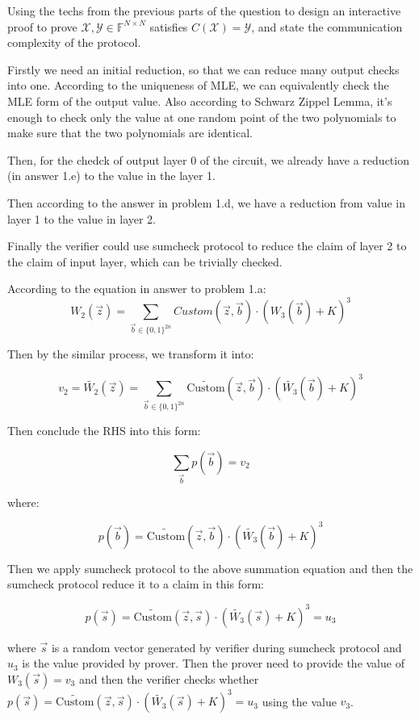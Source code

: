 \documentclass[12pt]{article}
\newenvironment{ex}[2][Exercise]{\begin{trivlist}
\item[\hskip \labelsep {\bfseries #1}\hskip \labelsep {\bfseries #2.}]\begin{spacing}{1.0}}{\end{spacing}\end{trivlist}}
\newenvironment{sol}[1][Solution]{\begin{trivlist}
\item[\hskip \labelsep {\bfseries #1:}]}{\end{trivlist}}
\begin{document}
\begin{ex}{1.f}
    Using the techs from the previous parts of the question to design an interactive proof to prove $\mathcal{X,Y} \in \mathbb{F}^{N \times N}$ satisfies $C(\mathcal{X}) = \mathcal{Y}$, and state the communication complexity of the protocol.
\end{ex}

\begin{sol}
    Firstly we need an initial reduction, so that we can reduce many output checks into one. According to the uniqueness of MLE, we can equivalently check the MLE form of the output value. Also according to Schwarz Zippel Lemma, it's enough to check only the value at one random point of the two polynomials to make sure that the two polynomials are identical.

    Then, for the chedck of output layer 0 of the circuit, we already have a reduction (in answer 1.e) to the value in the layer 1.

    Then according to the answer in problem 1.d, we have a reduction from value in layer 1 to the value in layer 2.

    Finally the verifier could use sumcheck protocol to reduce the claim of layer 2 to the claim of input layer, which can be trivially checked.

    According to the equation in answer to problem 1.a:
    $$
        W_2(\vec{z}) = \sum_{\vec{b} \in \{0,1\}^{2n}} Custom(\vec{z}, \vec{b}) \cdot (W_3(\vec{b}) + K)^3
    $$

    Then by the similar process, we transform it into:

    $$
        v_2 = \tilde{W_2}(\vec{z}) = \sum_{\vec{b} \in \{0,1\}^{2n}} \tilde{\text{Custom}}(\vec{z}, \vec{b}) \cdot (\tilde{W_3}(\vec{b}) + K)^3
    $$

    Then conclude the RHS into this form:

    $$
        \sum_{\vec{b}} p(\vec{b}) = v_2
    $$

    where:

    $$
        p(\vec{b}) = \tilde{\text{Custom}}(\vec{z}, \vec{b}) \cdot (\tilde{W_3}(\vec{b}) + K)^3
    $$

    Then we apply sumcheck protocol to the above summation equation and then the sumcheck protocol reduce it to a claim in this form:

    $$
        p(\vec{s}) = \tilde{\text{Custom}}(\vec{z}, \vec{s}) \cdot (\tilde{W_3}(\vec{s}) + K)^3 = u_3
    $$

    where $\vec{s}$ is a random vector generated by verifier during sumcheck protocol and $u_3$ is the value provided by prover. Then the prover need to provide the value of $W_3(\vec{s}) = v_3$ and then the verifier checks whether  $p(\vec{s}) = \tilde{\text{Custom}}(\vec{z}, \vec{s}) \cdot (\tilde{W_3}(\vec{s}) + K)^3 = u_3$ using the value $v_3$.


\end{sol}
\end{document}

